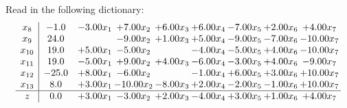 \documentclass[9pt]{article}
\begin{document}
Read in the following dictionary:
\[\begin{array}{c| c c@{\hskip 2pt} c@{\hskip 2pt} c@{\hskip 2pt} c@{\hskip 2pt} c@{\hskip 2pt} c@{\hskip 2pt} c@{\hskip 2pt} }
 x_{8}   &  -1.0 & -3.00 x_{1} & +  7.00 x_{2} & +  6.00 x_{3} & +  6.00 x_{4} & -7.00 x_{5} & +  2.00 x_{6} & +  4.00 x_{7}\\
 x_{9}   &  24.0  &   & -9.00 x_{2} & +  1.00 x_{3} & +  5.00 x_{4} & -9.00 x_{5} & -7.00 x_{6} & -10.00 x_{7}\\
 x_{10}   &  19.0 & +  5.00 x_{1} & -5.00 x_{2} &   & -4.00 x_{4} & -5.00 x_{5} & +  4.00 x_{6} & -10.00 x_{7}\\
 x_{11}   &  19.0 & -5.00 x_{1} & +  9.00 x_{2} & +  4.00 x_{3} & -6.00 x_{4} & -3.00 x_{5} & +  4.00 x_{6} & -9.00 x_{7}\\
 x_{12}   &  -25.0 & +  8.00 x_{1} & -6.00 x_{2} &   & -1.00 x_{4} & +  6.00 x_{5} & +  3.00 x_{6} & + 10.00 x_{7}\\
 x_{13}   &  8.0 & +  3.00 x_{1} & -10.00 x_{2} & -8.00 x_{3} & +  2.00 x_{4} & -2.00 x_{5} & -1.00 x_{6} & + 10.00 x_{7}\\
\hline
z    &  0.0 & +  3.00 x_{1} & -3.00 x_{2} & +  2.00 x_{3} & -4.00 x_{4} & +  3.00 x_{5} & +  1.00 x_{6} & +  4.00 x_{7}\\
\end{array}\]
\end{document}
